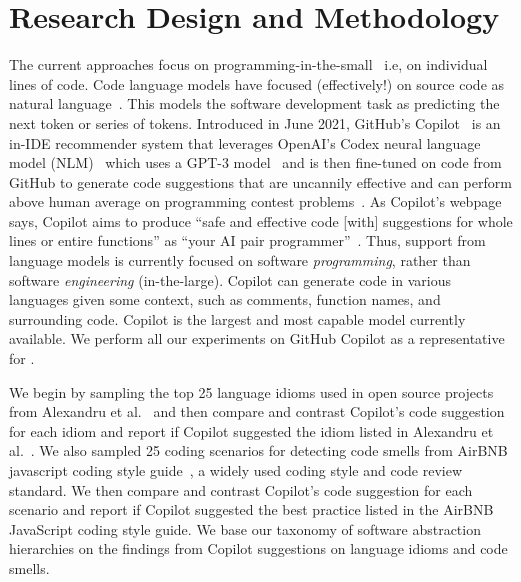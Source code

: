 \section{Research Design and Methodology}
The current \cct{} approaches focus on programming-in-the-small~\cite{DeRemer1976} i.e, on individual lines of code. 
Code language models have focused (effectively!) on source code as natural language~\cite{natural}.
This models the software development task as predicting the next token or series of tokens.
Introduced in June 2021, GitHub's Copilot~\cite{Copilot-web} is an in-IDE recommender system that leverages OpenAI's Codex neural language model (NLM)~\cite{copilot} which uses a GPT-3 model~\cite{Gpt3} and is then fine-tuned on code from GitHub to generate code suggestions that are uncannily effective and can perform above human average on programming contest problems~\cite{empirical_eval}. As Copilot's webpage says, Copilot aims to produce ``safe and effective code [with] suggestions for whole lines or entire functions'' as ``your AI pair programmer''~\cite{Copilot-web}. 
Thus, support from language models is currently focused on software \textit{programming}, rather than software \emph{engineering} (in-the-large).
Copilot can generate code in various languages given some context, such as comments, function names, and surrounding code. Copilot is the largest and most capable model currently available. We perform all our experiments on GitHub Copilot as a representative for \cct{}.

We begin by sampling the top 25 language idioms used in open source projects from Alexandru et al.~\cite{Alexandru2018} and then compare and contrast Copilot's code suggestion for each idiom and report if Copilot suggested the idiom listed in Alexandru et al.~\cite{Alexandru2018}. 
We also sampled 25 coding scenarios for detecting code smells from AirBNB javascript coding style guide~\cite{airbnb_code}, a widely used coding style and code review standard. We then compare and contrast Copilot's code suggestion for each scenario and report if Copilot suggested the best practice listed in the AirBNB JavaScript coding style guide. 
We base our taxonomy of software abstraction hierarchies on the findings from Copilot suggestions on language idioms and code smells.

